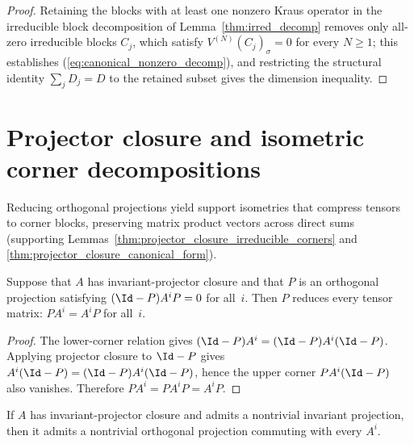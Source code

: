 \begin{proof}\leanok
    Retaining the blocks with at least one nonzero Kraus operator in the
    irreducible block decomposition of Lemma~\ref{thm:irred_decomp} removes
    only all-zero irreducible blocks $C_j$, which satisfy
    $V^{(N)}(C_j)_\sigma=0$ for every $N\ge1$; this establishes
    (\ref{eq:canonical_nonzero_decomp}), and restricting the structural identity
    $\sum_jD_j=D$ to the retained subset gives the dimension inequality.
\end{proof}

\section{Projector closure and isometric corner decompositions}
\label{sec:app_canonical_projector_corners}

Reducing orthogonal projections yield support isometries that compress tensors to
corner blocks, preserving matrix product vectors across direct sums (supporting
Lemmas~\ref{thm:projector_closure_irreducible_corners} and
\ref{thm:projector_closure_canonical_form}).

\begin{lemma}
    \label{thm:invariant_projector_closure_commutes}
    \leanok
    Suppose that $A$ has invariant-projector closure and that $P$ is an
    orthogonal projection satisfying $(\Id-P)A^iP=0$ for all~$i$. Then $P$
    reduces every tensor matrix: $PA^i=A^iP$ for all~$i$.
\end{lemma}

\begin{proof}
    \leanok
    The lower-corner relation gives
    $(\Id-P)A^i=(\Id-P)A^i(\Id-P)$. Applying projector closure to $\Id-P$
    gives $A^i(\Id-P)=(\Id-P)A^i(\Id-P)$, hence the upper corner
    $PA^i(\Id-P)$ also vanishes. Therefore $PA^i=PA^iP=A^iP$.
\end{proof}

\begin{lemma}
    \label{thm:exists_reducing_projection_of_invariant_projector}
    \leanok
    If $A$ has invariant-projector closure and admits a nontrivial invariant
    projection, then it admits a nontrivial orthogonal projection commuting
    with every $A^i$.
\end{lemma}


